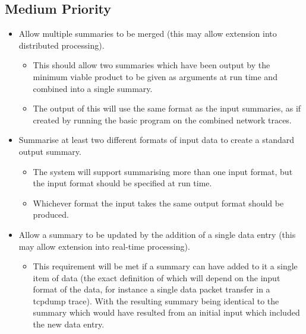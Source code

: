 \subsection{Medium Priority}
\begin{itemize}
    \item Allow multiple summaries to be merged (this may allow extension into distributed processing).
    \begin{itemize}
        \item This should allow two summaries which have been output by the minimum viable product to be given as arguments at run time and combined into a single summary.
        \item The output of this will use the same format as the input summaries, as if created by running the basic program on the combined network traces. 
    \end{itemize}
    \item Summarise at least two different formats of input data to create a standard output summary.
    \begin{itemize}
        \item The system will support summarising more than one input format, but the input format should be specified at run time.
        \item Whichever format the input takes the same output format should be produced. 
    \end{itemize}
    \item Allow a summary to be updated by the addition of a single data entry (this may allow extension into real-time processing).
    \begin{itemize}
        \item This requirement will be met if a summary can have added to it a single item of data (the exact definition of which will depend on the input format of the data, for instance a single data packet transfer in a tcpdump trace). With the resulting summary being identical to the summary which would have resulted from an initial input which included the new data entry.
    \end{itemize}
\end{itemize}

